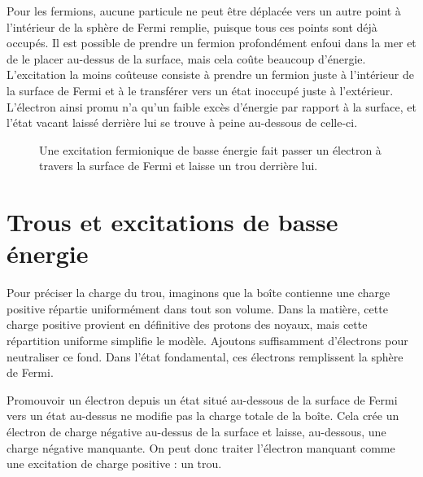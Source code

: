Pour les fermions, aucune particule ne peut être déplacée vers un autre point à l’intérieur de la sphère de Fermi remplie, puisque tous ces points sont déjà occupés. Il est possible de prendre un fermion profondément enfoui dans la mer et de le placer au-dessus de la surface, mais cela coûte beaucoup d’énergie. L’excitation la moins coûteuse consiste à prendre un fermion juste à l’intérieur de la surface de Fermi et à le transférer vers un état inoccupé juste à l’extérieur. L’électron ainsi promu n’a qu’un faible excès d’énergie par rapport à la surface, et l’état vacant laissé derrière lui se trouve à peine au-dessous de celle-ci.

\begin{figure}
\centering
{}
\caption{Une excitation fermionique de basse énergie fait passer un électron à travers la surface de Fermi et laisse un trou derrière lui.}
\end{figure}

\section{Trous et excitations de basse énergie}

Pour préciser la charge du trou, imaginons que la boîte contienne une charge positive répartie uniformément dans tout son volume. Dans la matière, cette charge positive provient en définitive des protons des noyaux, mais cette répartition uniforme simplifie le modèle. Ajoutons suffisamment d’électrons pour neutraliser ce fond. Dans l’état fondamental, ces électrons remplissent la sphère de Fermi.

Promouvoir un électron depuis un état situé au-dessous de la surface de Fermi vers un état au-dessus ne modifie pas la charge totale de la boîte. Cela crée un électron de charge négative au-dessus de la surface et laisse, au-dessous, une charge négative manquante. On peut donc traiter l’électron manquant comme une excitation de charge positive : un trou.

\begin{classroomqa}
\end{classroomqa}

